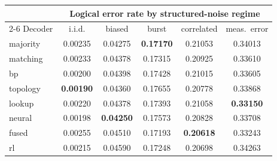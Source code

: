 \begin{tabular}{lccccc}
\toprule
 & \multicolumn{5}{c}{Logical error rate by structured-noise regime} \\
\cmidrule(lr){2-6}
Decoder & i.i.d. & biased & burst & correlated & meas.\ error \\
\midrule
majority  & 0.00235 & 0.04275 & \textbf{0.17170} & 0.21053 & 0.34013 \\
matching  & 0.00233 & 0.04378 & 0.17315 & 0.20925 & 0.33610 \\
bp        & 0.00200 & 0.04398 & 0.17428 & 0.21015 & 0.33605 \\
topology  & \textbf{0.00190} & 0.04360 & 0.17655 & 0.20778 & 0.33868 \\
lookup    & 0.00220 & 0.04378 & 0.17393 & 0.21058 & \textbf{0.33150} \\
neural    & 0.00198 & \textbf{0.04250} & 0.17573 & 0.20828 & 0.33708 \\
fused     & 0.00255 & 0.04510 & 0.17193 & \textbf{0.20618} & 0.33243 \\
rl        & 0.00215 & 0.04590 & 0.17248 & 0.20698 & 0.34263 \\
\bottomrule
\end{tabular}

